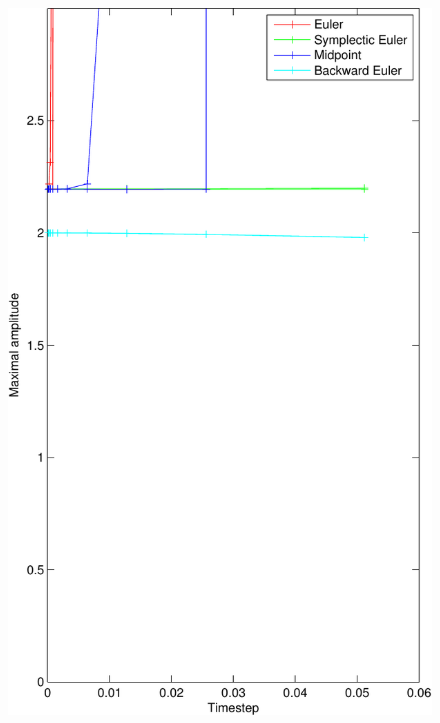 \begin{figure}[]
	\begin{center}
		\includegraphics*[width=\textwidth]{graphics/StabilityDamp0_01-crop.pdf}
	\end{center}
	\caption{}
	\label{fig:}
\end{figure}
